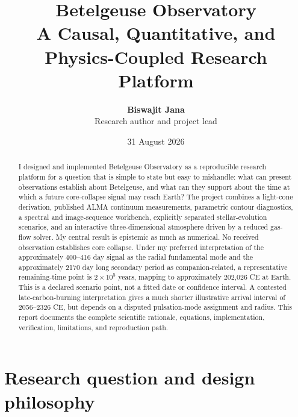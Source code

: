 \documentclass[11pt,a4paper]{article}
\title{\vspace{-1.2cm}\textbf{Betelgeuse Observatory}\\[0.35em]
\large A Causal, Quantitative, and Physics-Coupled Research Platform}
\author{\textbf{Biswajit Jana}\\Research author and project lead}
\date{31 August 2026}
\begin{document}
\maketitle

\begin{abstract}
I designed and implemented Betelgeuse Observatory as a reproducible research platform for a question that is simple to state but easy to mishandle: what can present observations establish about Betelgeuse, and what can they support about the time at which a future core-collapse signal may reach Earth? The project combines a light-cone derivation, published ALMA continuum measurements, parametric contour diagnostics, a spectral and image-sequence workbench, explicitly separated stellar-evolution scenarios, and an interactive three-dimensional atmosphere driven by a reduced gas-flow solver. My central result is epistemic as much as numerical. No received observation establishes core collapse. Under my preferred interpretation of the approximately 400--416 day signal as the radial fundamental mode and the approximately 2170 day long secondary period as companion-related, a representative remaining-time point is $2\times10^5$ years, mapping to approximately 202,026 CE at Earth. This is a declared scenario point, not a fitted date or confidence interval. A contested late-carbon-burning interpretation gives a much shorter illustrative arrival interval of 2056--2326 CE, but depends on a disputed pulsation-mode assignment and radius. This report documents the complete scientific rationale, equations, implementation, verification, limitations, and reproduction path.
\end{abstract}

\vspace{0.5em}
\begin{center}
\end{center}

\tableofcontents
\clearpage

\section{Research question and design philosophy}
\end{document}
